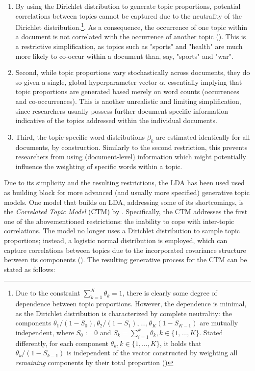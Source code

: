 \begin{enumerate}[label=(\roman*)]
\vspace{-0.25cm}
\item By using the Dirichlet distribution to generate topic proportions, potential correlations between topics cannot be captured due to the neutrality of the Dirichlet distribution.\footnote{Due to the constraint $\sum_{k=1}^{K}\theta_{k}=1$, there is clearly some degree of dependence between topic proportions. However, the dependence is minimal, as the Dirichlet distribution is characterized by complete neutrality: the components $\theta_1/(1-S_0), \theta_2/(1-S_1),\dots, \theta_K(1-S_{K-1})$ are mutually independent, where $S_0:=0$ and $S_k = \sum_{i=1}^{k}\theta_k, k \in \{1,\dots,K\}$. Stated differently, for each component $\theta_k, k \in \{1,\dots,K\}$, it holds that $\theta_k/(1-S_{k-1})$ is independent of the vector constructed by weighting all \textit{remaining} components by their total proportion (\citealp{james1980new})}. As a consequence, the occurrence of one topic within a document is not correlated with the occurrence of another topic (\citealp{blei2007correlated}). This is a restrictive simplification, as topics such as "sports" and "health" are much more likely to co-occur within a document than, say, "sports" and "war".
\vspace{-0.25cm}
\item Second, while topic proportions vary stochastically across documents, they do so given a single, global hyperparameter vector $\alpha$, essentially implying that topic proportions are generated based merely on word counts (occurrences and co-occurrences). This is another unrealistic and limiting simplification, since researchers usually possess further document-specific information indicative of the topics addressed within the individual documents.
\vspace{-0.25cm}
\item Third, the topic-specific word distributions $\beta_k$ are estimated identically for all documents, by construction. Similarly to the second restriction, this prevents researchers from using (document-level) information which might potentially influence the weighting of specific words within a topic.

\end{enumerate}

\noindent
Due to its simplicity and the resulting restrictions, the LDA has been used used as building block for more advanced (and usually more specified) generative topic models. One model that builds on LDA, addressing some of its shortcomings, is the \textit{Correlated Topic Model} (CTM) by \cite{blei2007correlated}. Specifically, the CTM addresses the first one of the abovementioned restrictions: the inability to cope with inter-topic correlations. The model no longer uses a Dirichlet distribution to sample topic proportions; instead, a logistic normal distribution is employed, which can capture correlations between topics due to the incorporated covariance structure between its components (\citealp{atchison1980logistic}). The resulting generative process for the CTM can be stated as follows:

